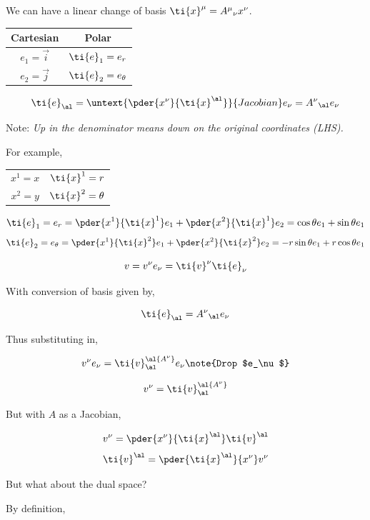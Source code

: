 \documentclass{article}
\begin{document}
We can have a linear change of basis $\ti{x}^\mu = {A^\mu}_\nu x^\nu $.


\begin{center}
\begin{tabular}{c|c}
    Cartesian & Polar \\
    \hline
    $e_1 = \vec{i}$ & $\ti{e}_1 = e_r$ \\
    $e_2 = \vec{j}$ & $\ti{e}_2 = e_\theta$ \\
\end{tabular}
\end{center}


\[ \ti{e}_\al = \untext{\pder{x^\nu}{\ti{x}^\al}}{Jacobian} e_\nu = {A^{\nu}}_\al e_\nu \]

Note: \textit{Up in the denominator means down on the original coordinates (LHS).}

For example,

\begin{center}
\begin{tabular}{c|c}
    $x^1 = x$ & $\ti{x}^1 = r$ \\
    $x^2 = y$ & $\ti{x}^2 = \theta$ \\
\end{tabular}
\end{center}

\[ \ti{e}_1 = e_r = \pder{x^1}{\ti{x}^1} e_1 + \pder{x^2}{\ti{x}^1} e_2 = \cos \theta e_1 + \sin \theta e_1 \]
\[ \ti{e}_2 = e_\theta = \pder{x^1}{\ti{x}^2} e_1 + \pder{x^2}{\ti{x}^2} e_2 = - r \sin \theta e_1 + r \cos \theta e_1 \]


\[ v = v^\nu e_\nu = \ti{v}^\nu \ti{e}_\nu \]

With conversion of basis given by,

\[ \ti{e}_\al = {A^\nu}_\al e_\nu\]

Thus substituting in,

\[ v^\nu e_\nu = \ti{v}^\al {A^\nu}_\al e_\nu \note{Drop $e_\nu$}\]

\[ v^\nu = \ti{v}^\al {A^\nu}_\al \]

But with $A$ as a Jacobian,

\[ v^\nu = \pder{x^\nu}{\ti{x}^\al} \ti{v}^\al \]
\[  \ti{v}^\al = \pder{\ti{x}^\al}{x^\nu} v^\nu \]

But what about the dual space?

By definition,
\end{document}
